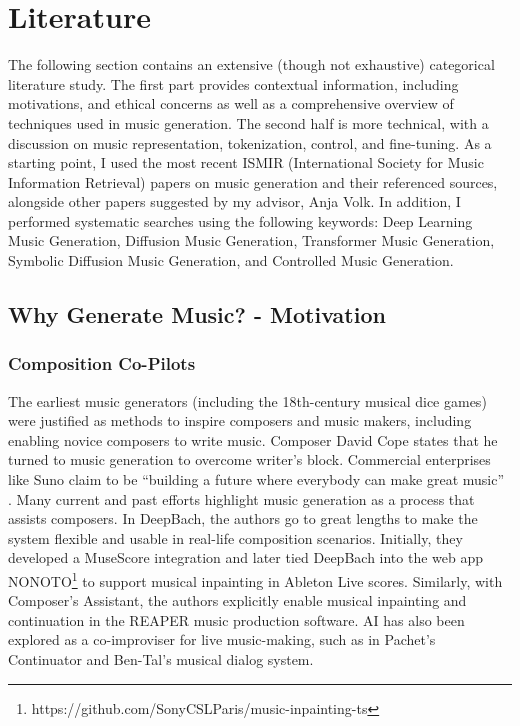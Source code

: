 

\chapter{Literature} \label{chap:data}
\pagestyle{fancy}

The following section contains an extensive (though not exhaustive) categorical literature study. The first part provides contextual information, including motivations, and ethical concerns as well as a comprehensive overview of techniques used in music generation. The second half is more technical, with a discussion on music representation, tokenization, control, and fine-tuning. 
As a starting point, I used the most recent ISMIR (International Society for Music Information Retrieval) papers on music generation and their referenced sources, alongside other papers suggested by my advisor, Anja Volk. In addition, I performed systematic searches using the following keywords: Deep Learning Music Generation, Diffusion Music Generation, Transformer Music Generation, Symbolic Diffusion Music Generation, and Controlled Music Generation.

\section{Why Generate Music? - Motivation}
\label{section:motivation}
\subsection{Composition Co-Pilots}
The earliest music generators (including the 18th-century musical dice games\cite{Nierhaus_2009}) were justified as methods to inspire composers and music makers, including enabling novice composers to write music. Composer David Cope\cite{Cope_1989} states that he turned to music generation to overcome writer’s block. Commercial enterprises like Suno claim to be “building a future where everybody can make great music” \cite{Suno_AI}. Many current and past efforts highlight music generation as a process that assists composers. In DeepBach\cite{Hadjeres_Pachet_Nielsen_2017}, the authors go to great lengths to make the system flexible and usable in real-life composition scenarios. Initially, they developed a MuseScore integration and later tied DeepBach into the web app NONOTO\footnote{https://github.com/SonyCSLParis/music-inpainting-ts} to support musical inpainting in Ableton Live scores. Similarly, with Composer’s Assistant\cite{Malandro_2023}, the authors explicitly enable musical inpainting and continuation in the REAPER music production software. AI has also been explored as a co-improviser for live music-making, such as in Pachet's Continuator\cite{Pachet_2003} and Ben-Tal's musical dialog system\cite{Kite-Powell_2023}.

